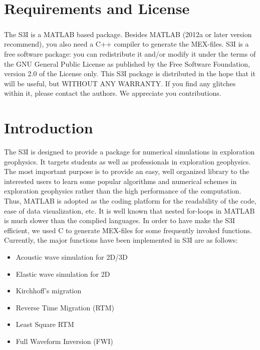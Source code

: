 \documentclass[11pt,titlepage]{article}
\theoremstyle{plain}
\theoremstyle{definition}
\theoremstyle{remark}
\numberwithin{equation}{section}
\begin{document}

\tableofcontents
\newpage



\section{Requirements and License}
The S3I is a MATLAB\textsuperscript{\textregistered} based package. Besides MATLAB (2012a or later version recommend), you also need a C++ compiler to generate the MEX-files. 
S3I is a free software package: you can redistribute it and/or modify it under the terms of the GNU General Public License as
published by the Free Software Foundation, version 2.0 of the License only. This S3I package is distributed in the hope that 
it will be useful, but WITHOUT ANY WARRANTY. If you find any glitches within it, please contact the authors. 
We appreciate you contributions. 



\section{Introduction}
The S3I is designed to provide a package for numerical simulations in exploration geophysics. It targets students as well as professionals in exploration geophysics. The most important purpose is to provide an easy, well organized library to the interested users to learn some popular algorithms and numerical schemes in exploration geophysics rather than the high performance of the computation. Thus, MATLAB is adopted as the coding platform for the readability of the code, ease of data visualization, etc. It is well known that nested for-loops in MATLAB is much slower than the complied languages. In order to have make the S3I efficient, we used C to generate MEX-files for some frequently invoked functions. 
Currently, the major functions have been implemented in S3I are as follows:
\begin{itemize}
\item Acoustic wave simulation for 2D/3D
\item Elastic wave simulation for 2D
\item Kirchhoff's migration
\item Reverse Time Migration (RTM)
\item Least Square RTM
\item Full Waveform Inversion (FWI)
\end{itemize}
\end{document}
